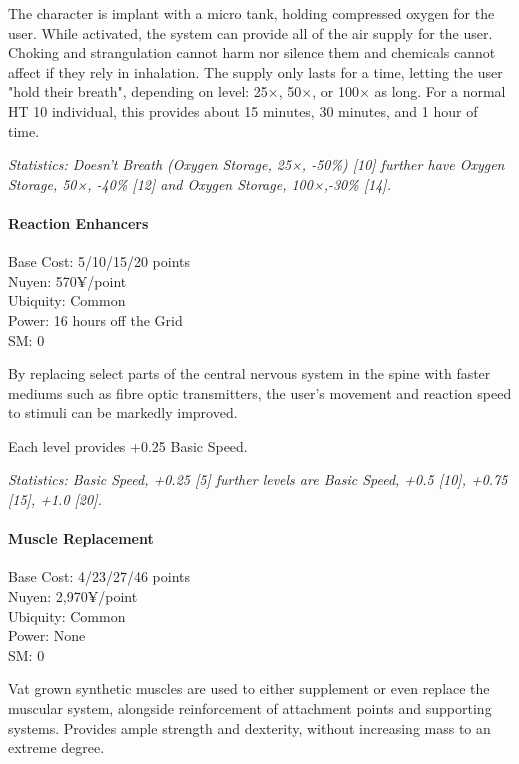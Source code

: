 \begin{multicols*}{3}
	The character is implant with a micro tank, holding compressed oxygen for the user. While activated, the system can provide all of the air supply for the user. Choking and strangulation cannot harm nor silence them and chemicals cannot affect if they rely in inhalation. The supply only lasts for a time, letting the user "hold their breath", depending on level: 25×, 50×, or 100× as long. For a normal HT 10 individual, this provides about 15 minutes, 30 minutes, and 1 hour of time.
	
	\textit{\textcolor{OliveGreen}{Statistics: Doesn't Breath (Oxygen Storage, 25×, -50\%) [10] further have Oxygen Storage, 50×, -40\% [12] and Oxygen Storage, 100×,-30\% [14].}}
	
	\paragraph{Reaction Enhancers}
	\begin{flushright}
		Base Cost: 5/10/15/20 points\\
		Nuyen: 570¥/point\\
		Ubiquity: Common\\
		Power: 16 hours off the Grid\\
		SM: 0
	\end{flushright}
	
	By replacing select parts of the central nervous system in the spine with faster mediums such as fibre optic transmitters, the user's movement and reaction speed to stimuli can be markedly improved.
	
	Each level provides +0.25 Basic Speed.
	
	\textit{\textcolor{OliveGreen}{Statistics: Basic Speed, +0.25 [5] further levels are Basic Speed, +0.5 [10], +0.75 [15], +1.0 [20].}}
	
	\paragraph{Muscle Replacement}
	\begin{flushright}
		Base Cost: 4/23/27/46 points\\
		Nuyen: 2,970¥/point\\
		Ubiquity: Common\\
		Power: None\\
		SM: 0
	\end{flushright}
	
	Vat grown synthetic muscles are used to either supplement or even replace the muscular system, alongside reinforcement of attachment points and supporting systems. Provides ample strength and dexterity, without increasing mass to an extreme degree.
	

\end{multicols*}
